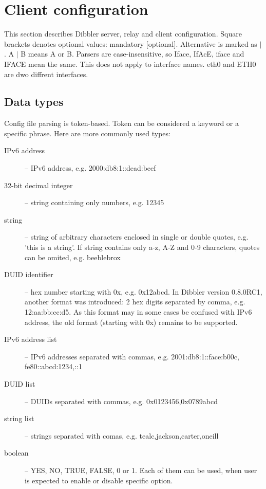 \newpage
\section{Client configuration}

This section describes Dibbler server, relay  and client
configuration. Square brackets denotes optional values: mandatory
[optional]. Alternative is marked as $\mid$. A $\mid$ B means A or
B. Parsers are case-insensitive, so Iface, IfAcE, iface and IFACE mean
the same. This does not apply to interface names. eth0 and
ETH0 are dwo diffrent interfaces.

\subsection{Data types}
Config file parsing is token-based. Token can be considered a keyword
or a specific phrase. Here are more commonly used types:
\begin{description}
\item[IPv6 address] -- IPv6 address, e.g. 2000:db8:1::dead:beef
\item[32-bit decimal integer] -- string containing only numbers, e.g. 12345
\item[string] -- string of arbitrary characters enclosed in single or double
  quotes, e.g. 'this is a string'. If string contains only a-z, A-Z and
  0-9 characters, quotes can be omited, e.g. beeblebrox
\item[DUID identifier] -- hex number starting with 0x,
  e.g. 0x12abcd. In Dibbler version 0.8.0RC1, another format was
  introduced: 2 hex digits separated by comma, e.g. 12:aa:bb:cc:d5. As
  this format may in some cases be confused with IPv6 address, the old
  format (starting with 0x) remains to be supported.
\item[IPv6 address list] -- IPv6 addresses separated with commas,
           e.g. 2001:db8:1::face:b00c, fe80::abcd:1234,::1
\item[DUID list] -- DUIDs separated with commas, e.g. 0x0123456,0x0789abcd
\item[string list] -- strings separated with comas, e.g. tealc,jackson,carter,oneill
\item[boolean] -- YES, NO, TRUE, FALSE, 0 or 1. Each of them can be
  used, when user is expected to enable or disable specific option.
\end{description}

